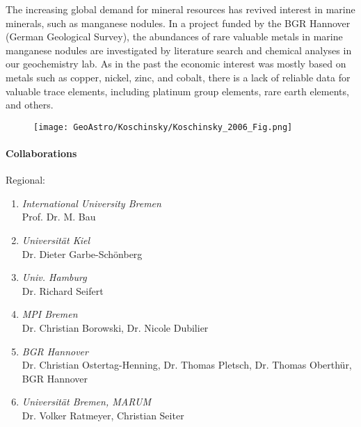 The increasing global demand for mineral resources has revived
interest in marine minerals, such as manganese nodules. In a project
funded by the BGR Hannover (German Geological Survey), the abundances
of rare valuable metals in marine manganese nodules are investigated
by literature search and chemical analyses in our geochemistry lab. As
in the past the economic interest was mostly based on metals such as
copper, nickel, zinc, and cobalt, there is a lack of reliable data for
valuable trace elements, including platinum group elements, rare earth
elements, and others.

\nocite{koschinsky1}\nocite{koschinsky2}\nocite{koschinsky3}


\begin{figure}[ht]
  \begin{center}
    \texttt{[image: GeoAstro/Koschinsky/Koschinsky\_2006\_Fig.png]}
    \label{fig:profxxx}
   \end{center}
\end{figure}

\newpage
\paragraph{Collaborations}
\noindent

Regional:
\begin{enumerate}
\item {\sl International University Bremen}\\ Prof. Dr. M. Bau
\item {\sl Universit\"at Kiel}\\Dr. Dieter Garbe-Sch\"onberg
\item {\sl Univ. Hamburg}\\Dr. Richard Seifert
\item {\sl MPI Bremen} \\ Dr. Christian Borowski, Dr. Nicole
Dubilier
\item {\sl BGR Hannover} \\ Dr. Christian Ostertag-Henning, Dr. Thomas
Pletsch, Dr. Thomas Oberth\"ur, BGR
Hannover
\item {\sl Universit\"at Bremen, MARUM}\\ Dr. Volker Ratmeyer, Christian
Seiter
\end{enumerate}

